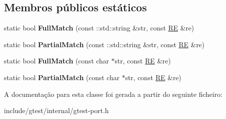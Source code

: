 \subsection*{Membros públicos estáticos}
\begin{DoxyCompactItemize}
\item 
\hypertarget{classtesting_1_1internal_1_1RE_aa79a950758d0f1d62f7762d1e9cefe86}{static bool {\bfseries Full\-Match} (const \-::std\-::string \&str, const \hyperlink{classtesting_1_1internal_1_1RE}{R\-E} \&re)}\label{classtesting_1_1internal_1_1RE_aa79a950758d0f1d62f7762d1e9cefe86}

\item 
\hypertarget{classtesting_1_1internal_1_1RE_a1e81f9a87211bdca645e025f8f0236c8}{static bool {\bfseries Partial\-Match} (const \-::std\-::string \&str, const \hyperlink{classtesting_1_1internal_1_1RE}{R\-E} \&re)}\label{classtesting_1_1internal_1_1RE_a1e81f9a87211bdca645e025f8f0236c8}

\item 
\hypertarget{classtesting_1_1internal_1_1RE_a2b13ec1f6ccd6c32f7efa01e21588f0b}{static bool {\bfseries Full\-Match} (const char $\ast$str, const \hyperlink{classtesting_1_1internal_1_1RE}{R\-E} \&re)}\label{classtesting_1_1internal_1_1RE_a2b13ec1f6ccd6c32f7efa01e21588f0b}

\item 
\hypertarget{classtesting_1_1internal_1_1RE_a97495dd4c2bb9589522823f060c8e8ba}{static bool {\bfseries Partial\-Match} (const char $\ast$str, const \hyperlink{classtesting_1_1internal_1_1RE}{R\-E} \&re)}\label{classtesting_1_1internal_1_1RE_a97495dd4c2bb9589522823f060c8e8ba}

\end{DoxyCompactItemize}


A documentação para esta classe foi gerada a partir do seguinte ficheiro\-:\begin{DoxyCompactItemize}
\item 
include/gtest/internal/gtest-\/port.\-h\end{DoxyCompactItemize}
